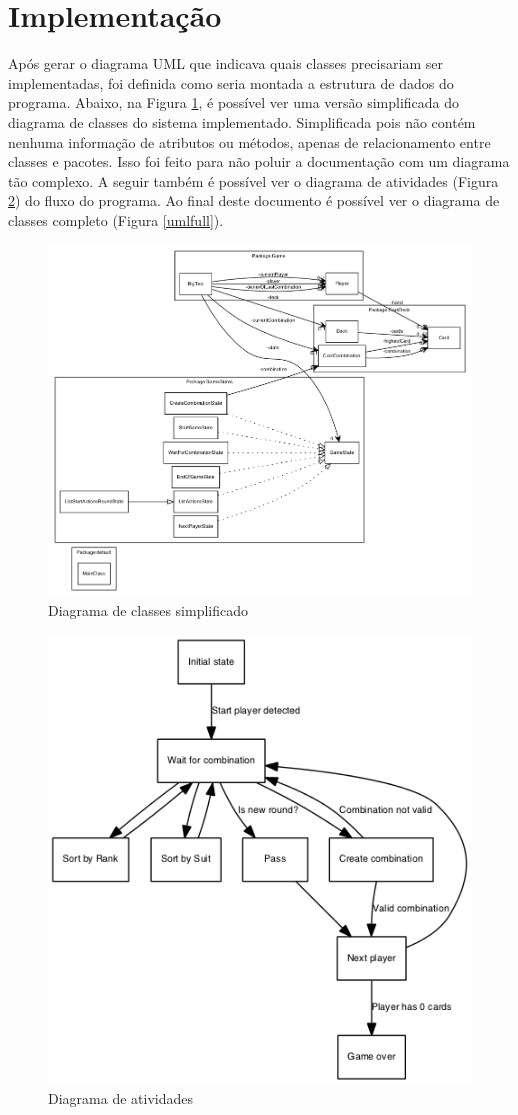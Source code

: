 \documentclass[12pt]{article}
\begin{document}
\section{Implementação}
\label{implementacao}

Após gerar o diagrama UML que indicava quais classes precisariam ser implementadas, foi definida como seria montada a estrutura de dados do programa. Abaixo, na Figura \ref{uml}, é possível ver uma versão simplificada do diagrama de classes do sistema implementado. Simplificada pois não contém nenhuma informação de atributos ou métodos, apenas de relacionamento entre classes e pacotes. Isso foi feito para não poluir a documentação com um diagrama tão complexo. A seguir também é possível ver o diagrama de atividades (Figura \ref{activity}) do fluxo do programa. Ao final deste documento é possível ver o diagrama de classes completo (Figura \ref{umlfull}).

\begin{figure}[h!]
	\centering
	\includegraphics[width=.8\textwidth]{umlsimple.png}
	\caption{Diagrama de classes simplificado}
	\label{uml}
\end{figure}

\begin{figure}[h!]
	\centering
	\includegraphics[width=.8\textwidth]{activity.png}
	\caption{Diagrama de atividades}
	\label{activity}
\end{figure}
\end{document}
